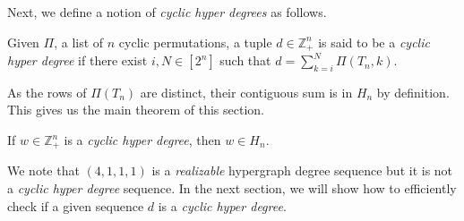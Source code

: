 Next, we define a notion of {\em cyclic hyper degrees} as follows.

\begin{definition}\label{def:chd}
 Given $\Pi$, a list of $n$ cyclic permutations, a tuple $d \in \mathbb{Z}_+^n$ is said to be a {\em cyclic hyper degree} if there exist $i, N \in [2^n]$ such that $d=\sum_{k=i}^N \Pi(T_n, k).$
\end{definition}

As the rows of $\Pi(T_n)$ are distinct, their contiguous sum  is in $H_n$ by definition. This gives us the main theorem of this section.

\begin{theorem}
 If $w\in \mathbb{Z}_+^n$ is a {\em cyclic hyper degree}, then $w\in H_n$.
\end{theorem}

We note that $(4,1,1,1)$ is a {\em realizable} hypergraph degree sequence but it is not a {\em cyclic hyper degree} sequence.
In the next section, we will show how to efficiently check if a given sequence $d$ is a {\em cyclic hyper degree}. 
